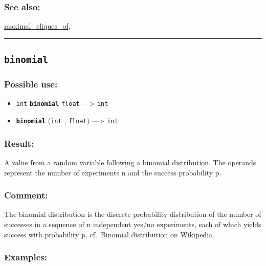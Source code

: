 \documentclass[]{book}
\providecommand{\tightlist}{%
  \setlength{\itemsep}{0pt}\setlength{\parskip}{0pt}}
\theoremstyle{definition}
\theoremstyle{definition}
\theoremstyle{definition}
\theoremstyle{remark}
\begin{document}
\subsubsection{See also:}\label{see-also-44}

\href{OperatorsIM\#maximal_cliques_of}{maximal\_cliques\_of},

\begin{center}\rule{0.5\linewidth}{\linethickness}\end{center}

\subsection{\texorpdfstring{\texttt{binomial}}{binomial}}\label{binomial}

\subsubsection{Possible use:}\label{possible-use-70}

\begin{itemize}
\tightlist
\item
  \texttt{int} \textbf{\texttt{binomial}} \texttt{float}
  ---\textgreater{} \texttt{int}
\item
  \textbf{\texttt{binomial}} (\texttt{int} , \texttt{float})
  ---\textgreater{} \texttt{int}
\end{itemize}

\subsubsection{Result:}\label{result-69}

A value from a random variable following a binomial distribution. The
operands represent the number of experiments n and the success
probability p.

\subsubsection{Comment:}\label{comment-15}

The binomial distribution is the discrete probability distribution of
the number of successes in a sequence of n independent yes/no
experiments, each of which yields success with probability p,
cf.~Binomial distribution on Wikipedia.

\subsubsection{Examples:}\label{examples-56}
\end{document}
